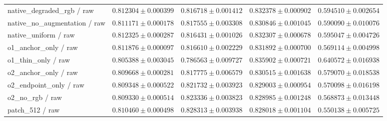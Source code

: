 \documentclass[jimaging,article,submit,pdftex,moreauthors]{Definitions/mdpi}
\begin{document}
\begin{longtable}{@{}>{\raggedright\arraybackslash}p{5.0cm}>{\raggedright\arraybackslash}p{2.5cm}>{\raggedright\arraybackslash}p{2.5cm}>{\raggedright\arraybackslash}p{2.5cm}>{\raggedright\arraybackslash}p{2.5cm}@{}}
native\_degraded\_rgb / raw & $0.812304\pm 0.000399$ & $0.816718\pm 0.001412$ & $0.832378\pm 0.000902$ & $0.594510\pm 0.002654$\\
native\_no\_augmentation / raw & $0.811171\pm 0.000178$ & $0.817555\pm 0.003308$ & $0.830846\pm 0.001045$ & $0.590090\pm 0.010076$\\
native\_uniform / raw & $0.812325\pm 0.000287$ & $0.816431\pm 0.001026$ & $0.832307\pm 0.000678$ & $0.595047\pm 0.004726$\\
o1\_anchor\_only / raw & $0.811876\pm 0.000097$ & $0.816610\pm 0.002229$ & $0.831892\pm 0.000700$ & $0.569114\pm 0.004998$\\
o1\_thin\_only / raw & $0.805388\pm 0.003045$ & $0.786563\pm 0.009727$ & $0.835902\pm 0.000721$ & $0.640572\pm 0.016938$\\
o2\_anchor\_only / raw & $0.809668\pm 0.000281$ & $0.817775\pm 0.006579$ & $0.830515\pm 0.001638$ & $0.579070\pm 0.018538$\\
o2\_endpoint\_only / raw & $0.809348\pm 0.000522$ & $0.821732\pm 0.003923$ & $0.829003\pm 0.000954$ & $0.570098\pm 0.016198$\\
o2\_no\_rgb / raw & $0.809330\pm 0.000514$ & $0.823336\pm 0.003823$ & $0.828985\pm 0.001248$ & $0.568873\pm 0.013448$\\
patch\_512 / raw & $0.810460\pm 0.000498$ & $0.828313\pm 0.003938$ & $0.828018\pm 0.001104$ & $0.550138\pm 0.005725$\\
\end{longtable}\endgroup
\end{document}
